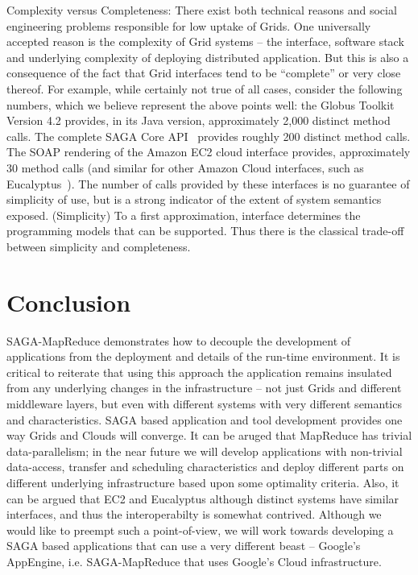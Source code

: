 \documentclass[conference,final]{IEEEtran}
\newcommand{\sagamapreduce }{SAGA-MapReduce }
\begin{document}
Complexity versus Completeness: There exist both technical reasons and
social engineering problems responsible for low uptake of Grids. One
universally accepted reason is the complexity of Grid systems -- the
interface, software stack and underlying complexity of deploying
distributed application. But this is also a consequence of the fact
that Grid interfaces tend to be ``complete'' or very close thereof.
For example, while certainly not true of all cases, consider the
following numbers, which we believe represent the above points well:
the Globus Toolkit Version 4.2 provides, in its Java version,
approximately 2,000 distinct method calls.  The complete SAGA Core
API~\cite{saga-core} provides roughly 200 distinct method calls.  The
SOAP rendering of the Amazon EC2 cloud interface provides,
approximately 30 method calls (and similar for other Amazon Cloud
interfaces, such as Eucalyptus~\cite{eucalyptus_url}).  The number of
calls provided by these interfaces is no guarantee of simplicity of
use, but is a strong indicator of the extent of system semantics
exposed.  (Simplicity) To a first approximation, interface determines
the programming models that can be supported. Thus there is the
classical trade-off between simplicity and completeness.

\section{Conclusion}



\sagamapreduce demonstrates how to decouple the development of
applications from the deployment and details of the run-time
environment.  It is critical to reiterate that using this approach the
application remains insulated from any underlying changes in the
infrastructure -- not just Grids and different middleware layers, but
even with different systems with very different semantics and
characteristics.  SAGA based application and tool development provides
one way Grids and Clouds will converge.  It can be aruged that
MapReduce has trivial data-parallelism; in the near future we will
develop applications with non-trivial data-access, transfer and
scheduling characteristics and deploy different parts on different
underlying infrastructure based upon some optimality criteria.  Also,
it can be argued that EC2 and Eucalyptus although distinct systems
have similar interfaces, and thus the interoperabilty is somewhat
contrived. Although we would like to preempt such a point-of-view, we
will work towards developing a SAGA based applications that can use a
very different beast -- Google's AppEngine, i.e. \sagamapreduce that
uses Google's Cloud infrastructure.
\end{document}
